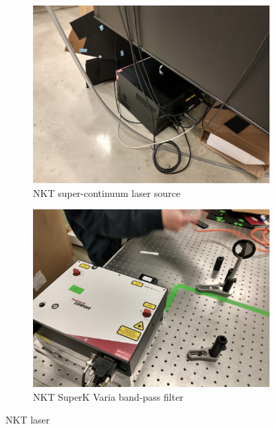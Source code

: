 \documentclass[a4paper]{article}
\begin{document}
\begin{figure}
     \centering
     \begin{subfigure}[b]{0.48\textwidth}
         \centering
         \includegraphics[width=\textwidth]{figures/IMG_20220422_134723634_HDR.jpg}
         \caption{NKT super-continuum laser source}
         \label{fig:super_continuum}
     \end{subfigure}
     \hfill
     \begin{subfigure}[b]{0.48\textwidth}
         \centering
         \includegraphics[width=\textwidth]{figures/IMG_20220422_134731107_HDR.jpg}
         \caption{NKT SuperK Varia band-pass filter}
         \label{fig:band_pass}
     \end{subfigure}
        \caption{NKT laser}
        \label{fig:NKT_laser_setup}
\end{figure}
\end{document}
